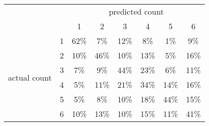 
\begin{tabular}{*{8}{c}}
& & \multicolumn{6}{c}{predicted count} \\
& & 1 & 2 & 3 & 4 & 5 & 6 \\
\multirow{6}{*}{\begin{sideways}actual count\end{sideways}}
& 1 & \cellcolor[rgb]{0.000000,1.000000,0.000000}62\% & \cellcolor[rgb]{0.975443,0.024557,0.000000}7\% & \cellcolor[rgb]{0.841309,0.158691,0.000000}12\% & \cellcolor[rgb]{0.971887,0.028113,0.000000}8\% & \cellcolor[rgb]{0.997938,0.002062,0.000000}1\% & \cellcolor[rgb]{0.960675,0.039325,0.000000}9\%\\
& 2 & \cellcolor[rgb]{0.933406,0.066594,0.000000}10\% & \cellcolor[rgb]{0.000009,0.999991,0.000000}46\% & \cellcolor[rgb]{0.933406,0.066594,0.000000}10\% & \cellcolor[rgb]{0.831816,0.168184,0.000000}13\% & \cellcolor[rgb]{0.989177,0.010823,0.000000}5\% & \cellcolor[rgb]{0.569328,0.430672,0.000000}16\%\\
& 3 & \cellcolor[rgb]{0.979969,0.020031,0.000000}7\% & \cellcolor[rgb]{0.960675,0.039325,0.000000}9\% & \cellcolor[rgb]{0.000018,0.999982,0.000000}44\% & \cellcolor[rgb]{0.071219,0.928781,0.000000}23\% & \cellcolor[rgb]{0.984753,0.015247,0.000000}6\% & \cellcolor[rgb]{0.902345,0.097655,0.000000}11\%\\
& 4 & \cellcolor[rgb]{0.989896,0.010104,0.000000}5\% & \cellcolor[rgb]{0.919227,0.080773,0.000000}11\% & \cellcolor[rgb]{0.159047,0.840953,0.000000}21\% & \cellcolor[rgb]{0.001187,0.998813,0.000000}34\% & \cellcolor[rgb]{0.739428,0.260572,0.000000}14\% & \cellcolor[rgb]{0.586267,0.413733,0.000000}16\%\\
& 5 & \cellcolor[rgb]{0.990567,0.009433,0.000000}5\% & \cellcolor[rgb]{0.971887,0.028113,0.000000}8\% & \cellcolor[rgb]{0.933406,0.066594,0.000000}10\% & \cellcolor[rgb]{0.333341,0.666659,0.000000}18\% & \cellcolor[rgb]{0.000017,0.999983,0.000000}44\% & \cellcolor[rgb]{0.697341,0.302659,0.000000}15\%\\
& 6 & \cellcolor[rgb]{0.945244,0.054756,0.000000}10\% & \cellcolor[rgb]{0.811482,0.188518,0.000000}13\% & \cellcolor[rgb]{0.937595,0.062405,0.000000}10\% & \cellcolor[rgb]{0.667251,0.332749,0.000000}15\% & \cellcolor[rgb]{0.902345,0.097655,0.000000}11\% & \cellcolor[rgb]{0.000049,0.999951,0.000000}41\%\\
\end{tabular}
